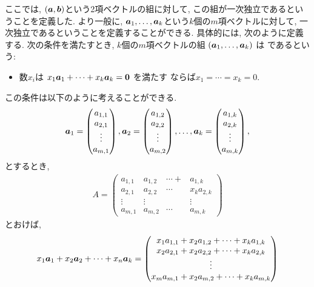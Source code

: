 \begin{remark}
  ここでは, $(\boldsymbol{a},\boldsymbol{b})$という2項ベクトルの組に対して,
  この組が一次独立であるということを定義した.
  より一般に, $\boldsymbol{a}_1,\ldots, \boldsymbol{a}_k$という$k$個の$m$項ベクトルに対して,
  一次独立であるということを定義することができる.
  具体的には, 次のように定義する.
  次の条件を満たすとき,
  $k$個の$m$項ベクトルの組
  $(\boldsymbol{a}_1,\ldots, \boldsymbol{a}_k)$
  は
  であるという:
  \begin{itemize}
  \item
    数$x_i$は
    $x_1\boldsymbol{a}_1+\cdots+x_k\boldsymbol{a}_k=\boldsymbol{0}$
    を満たす
    ならば$x_1=\cdots=x_k=0$.
  \end{itemize}
  この条件は以下のように考えることができる.
  \begin{align*}
    \boldsymbol{a}_1=\begin{pmatrix}a_{1,1}\\a_{2,1}\\\vdots\\a_{m,1}\end{pmatrix},
    \boldsymbol{a}_2=\begin{pmatrix}a_{1,2}\\a_{2,2}\\\vdots\\a_{m,2}\end{pmatrix},
    \ldots,
    \boldsymbol{a}_k=\begin{pmatrix}a_{1,k}\\a_{2,k}\\\vdots\\a_{m,k}\end{pmatrix},
  \end{align*}
  とするとき,
  \begin{align*}
    A
    =\begin{pmatrix}a_{1,1}&a_{1,2}&\cdots+&a_{1,k}\\a_{2,1}&a_{2,2}&\cdots&x_ka_{2,k}\\\vdots&\vdots&&\vdots\\a_{m,1}&a_{m,2}&\cdots&a_{m,k}\end{pmatrix}
  \end{align*}
  とおけば,
  \begin{align*}
    x_1\aaa_1+x_2\aaa_2+\cdots+x_n\aaa_k
    =\begin{pmatrix}x_1a_{1,1}+x_2a_{1,2}+\cdots+x_ka_{1,k}\\x_2a_{2,1}+x_2a_{2,2}+\cdots+x_ka_{2,k}\\\vdots\\x_ma_{m,1}+x_2a_{m,2}+\cdots+x_ka_{m,k}\end{pmatrix}

\end{align*}
\end{remark}
